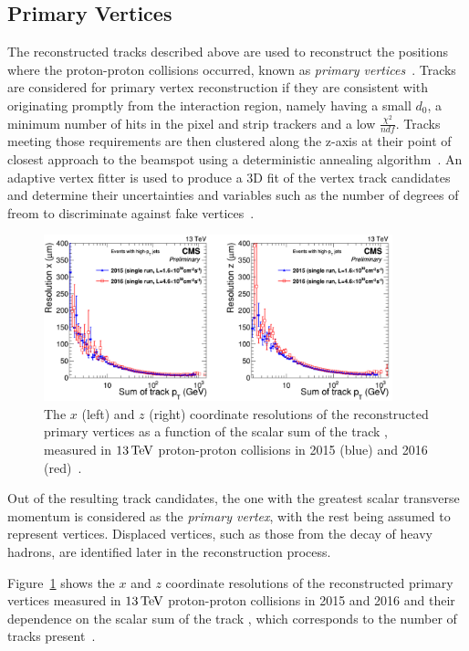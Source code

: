 \subsection{Primary Vertices}\label{subsec:vertices}
The reconstructed tracks described above are used to reconstruct the positions where the proton-proton collisions occurred, known as \emph{primary vertices}~\cite{Chatrchyan:2014fea,Speer:2006mh}. Tracks are considered for primary vertex reconstruction if they are consistent with originating promptly from the interaction region, namely having a small $d_{0}$, a minimum number of hits in the pixel and strip trackers and a low $\frac{\chi^{2}}{ndf}$.
Tracks meeting those requirements are then clustered along the z-axis at their point of closest approach to the beamspot using a deterministic annealing algorithm~\cite{Kenneth:1998i}.
An adaptive vertex fitter is used to produce a 3D fit of the vertex track candidates and determine their uncertainties and variables such as the number of degrees of freom to discriminate against fake vertices~\cite{Fruhwirth:2007hz}.

\begin{figure}[!htb]
\centering
\includegraphics[width=0.9\textwidth]{figs/data-mc/primaryVertexResolution.png}
\caption{The $x$ (left) and $z$ (right) coordinate resolutions of the reconstructed primary vertices as a function of the scalar sum of the track \pT, measured in $13\,\text{Te\hspace{-.08em}V}$ proton-proton collisions in 2015 (blue) and 2016 (red)~\cite{CMS-DP-2016-041}.}
\label{fig:primaryVertexResolution}
\end{figure}

Out of the resulting track candidates, the one with the greatest scalar transverse momentum is considered as the \emph{primary vertex}, with the rest being assumed to represent \PU vertices.
Displaced vertices, such as those from the decay of heavy hadrons, are identified later in the reconstruction process.

Figure~\ref{fig:primaryVertexResolution} shows the $x$ and $z$ coordinate resolutions of the reconstructed primary vertices measured in $13\,\text{Te\hspace{-.08em}V}$ proton-proton collisions in 2015 and 2016 and their dependence on the scalar sum of the track \pT, which corresponds to the number of tracks present~\cite{CMS-DP-2016-041}.

